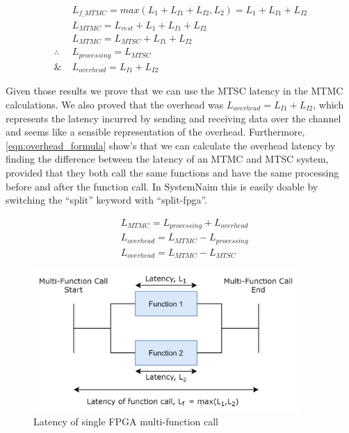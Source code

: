 \begin{align}
    &L_{f\_MTMC} = max(L_1 + L_{I1} + L_{I2} , L_2) = L_1 + L_{I1} + L_{I2} \label{eqn:mtmc_latency_start} \\
    &L_{MTMC} = L_{rest} + L_1 + L_{I1} + L_{I2}  \\
    &L_{MTMC} = L_{MTSC} + L_{I1} + L_{I2} \\
    \therefore \; &L_{processing} = L_{MTSC} \label{eqn:mtsc_processing} \\
    \& \; &L_{overhead} = L_{I1} + L_{I2} 
    \label{eqn:mtmc_latency}
\end{align}

Given those results we prove that we can use the MTSC latency in the MTMC calculations. We also proved that the overhead was $L_{overhead} = L_{I1} + L_{I2}$, which represents the latency incurred by sending and receiving data over the channel and seems like a sensible representation of the overhead. Furthermore, \autoref{eqn:overhead_formula} show's that we can calculate the overhead latency by finding the difference between the latency of an MTMC and MTSC system, provided that they both call the same functions and have the same processing before and after the function call. In SystemNaim this is easily doable by switching the “split” keyword with “split-fpga”. 

\begin{align}
    &L_{MTMC} = L_{processing} + L_{overhead} \\
    &L_{overhead} = L_{MTMC} - L_{processing}  \\
    &L_{overhead} = L_{MTMC} - L_{MTSC}\label{eqn:overhead_formula}
\end{align}

\begin{figure}[!htb]
    \centering
    \includegraphics[width=0.9\textwidth]{05_evaluation/images/concurrent_latency.png}
    \caption{Latency of single FPGA multi-function call}
    \label{fig:multi_func_call}
\end{figure}

